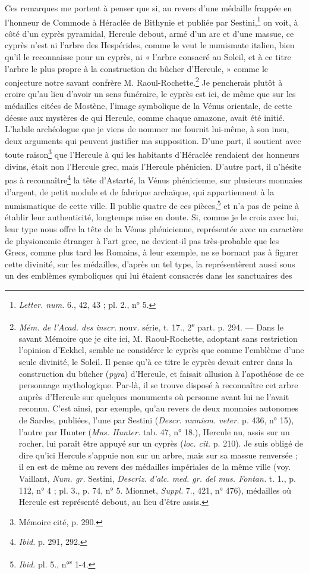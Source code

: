 \documentclass{article}
\begin{document}
Ces remarques me portent à penser que si, au revers d'une médaille frappée en l'honneur de Commode à Héraclée de Bithynie et publiée par Sestini,\footnote{\emph{Letter. num.} 6., 42, 43 ; pl. 2., n° 5.} on voit, à côté d'un cyprès pyramidal, Hercule debout, armé d'un arc et d'une massue, ce cyprès n'est ni l'arbre des Hespérides, comme le veut le numismate italien, bien qu'il le reconnaisse pour un cyprès, ni « l'arbre consacré au Soleil, et à ce titre l'arbre le plus propre à la construction du bûcher d'Hercule, » comme le conjecture notre savant confrère M. Raoul-Rochette.\footnote{\emph{Mém. de l'Acad. des inscr.} nouv. série, t. 17., 2\textsuperscript{e} part. p. 294. --- Dans le savant Mémoire que je cite ici, M. Raoul-Rochette, adoptant sans restriction l'opinion d'Eckhel, semble ne considérer le cyprès que comme l'emblème d'une seule divinité, le Soleil. Il pense qu'à ce titre le cyprès devait entrer dans la construction du bûcher (\emph{pyra}) d'Hercule, et faisait allusion à l'apothéose de ce personnage mythologique. Par-là, il se trouve disposé à reconnaître cet arbre auprès d'Hercule sur quelques monuments où personne avant lui ne l'avait reconnu. C'est ainsi, par exemple, qu'au revers de deux monnaies autonomes de Sardes, publiées, l'une par Sestini (\emph{Descr. numism. veter.} p. 436, n° 15), l'autre par Hunter (\emph{Mus. Hunter.} tab. 47, n° 18.), Hercule nu, assis sur un rocher, lui paraît être appuyé sur un cyprès (\emph{loc. cit.} p. 210). Je suis obligé de dire qu'ici Hercule s'appuie non sur un arbre, mais sur sa massue renversée ; il en est de même au revers des médailles impériales de la même ville (voy. Vaillant, \emph{Num. gr.} Sestini, \emph{Descriz. d'alc. med. gr. del mus. Fontan.} t. 1., p. 112, n° 4 ; pl. 3., p. 74, n° 5. Mionnet, \emph{Suppl.} 7., 421, n° 476), médailles où Hercule est représenté debout, au lieu d'être assis.} Je pencherais plutôt à croire qu'au lieu d'avoir un sens funéraire, le cyprès est ici, de même que sur les médailles citées de Mostène, l'image symbolique de la Vénus orientale, de cette déesse aux mystères de qui Hercule, comme chaque amazone, avait été initié. L'habile archéologue que je viens de nommer me fournit lui-même, à son insu, deux arguments qui peuvent justifier ma supposition. D'une part, il soutient avec toute raison\footnote{Mémoire cité, p. 290.} que l'Hercule à qui les habitants d'Héraclée rendaient des honneurs divins, était non l'Hercule grec, mais l'Hercule phénicien. D'autre part, il n'hésite pas à reconnaître\footnote{\emph{Ibid.} p. 291, 292.} la tête d'Astarté, la Vénus phénicienne, sur plusieurs monnaies d'argent, de petit module et de fabrique archaïque, qui appartiennent à la numismatique de cette ville. Il publie quatre de ces pièces,\footnote{\emph{Ibid.} pl. 5., n°\textsuperscript{s} 1-4.} et n'a pas de peine à établir leur authenticité, longtemps mise en doute. Si, comme je le crois avec lui, leur type nous offre la tête de la Vénus phénicienne, représentée avec un caractère de physionomie étranger à l'art grec, ne devient-il pas très-probable que les Grecs, comme plus tard les Romains, à leur exemple, ne se bornant pas à figurer cette divinité, sur les médailles, d'après un tel type, la représentèrent aussi sous un des emblèmes symboliques qui lui étaient consacrés dans les sanctuaires des 
\end{document}
